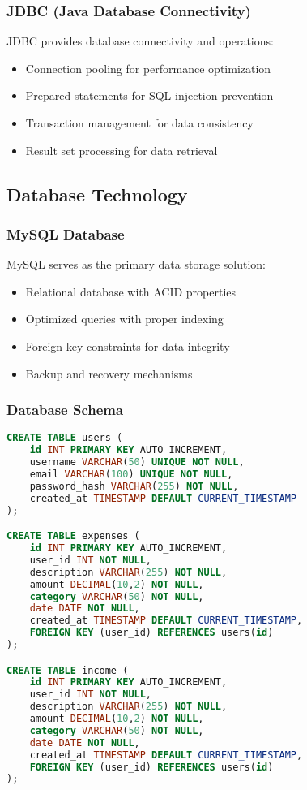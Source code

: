 \subsubsection{JDBC (Java Database Connectivity)}
JDBC provides database connectivity and operations:
\begin{itemize}
    \item Connection pooling for performance optimization
    \item Prepared statements for SQL injection prevention
    \item Transaction management for data consistency
    \item Result set processing for data retrieval
\end{itemize}

\subsection{Database Technology}

\subsubsection{MySQL Database}
MySQL serves as the primary data storage solution:
\begin{itemize}
    \item Relational database with ACID properties
    \item Optimized queries with proper indexing
    \item Foreign key constraints for data integrity
    \item Backup and recovery mechanisms
\end{itemize}

\subsubsection{Database Schema}
\begin{lstlisting}[language=SQL, caption=Database Schema Implementation]
CREATE TABLE users (
    id INT PRIMARY KEY AUTO_INCREMENT,
    username VARCHAR(50) UNIQUE NOT NULL,
    email VARCHAR(100) UNIQUE NOT NULL,
    password_hash VARCHAR(255) NOT NULL,
    created_at TIMESTAMP DEFAULT CURRENT_TIMESTAMP
);

CREATE TABLE expenses (
    id INT PRIMARY KEY AUTO_INCREMENT,
    user_id INT NOT NULL,
    description VARCHAR(255) NOT NULL,
    amount DECIMAL(10,2) NOT NULL,
    category VARCHAR(50) NOT NULL,
    date DATE NOT NULL,
    created_at TIMESTAMP DEFAULT CURRENT_TIMESTAMP,
    FOREIGN KEY (user_id) REFERENCES users(id)
);

CREATE TABLE income (
    id INT PRIMARY KEY AUTO_INCREMENT,
    user_id INT NOT NULL,
    description VARCHAR(255) NOT NULL,
    amount DECIMAL(10,2) NOT NULL,
    category VARCHAR(50) NOT NULL,
    date DATE NOT NULL,
    created_at TIMESTAMP DEFAULT CURRENT_TIMESTAMP,
    FOREIGN KEY (user_id) REFERENCES users(id)
);
\end{lstlisting}

